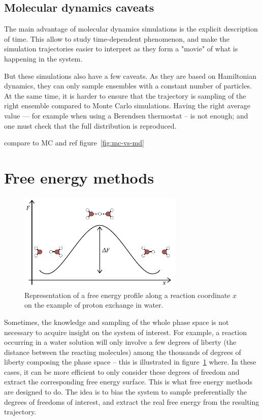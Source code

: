 \documentclass[thesis]{subfiles}
\begin{document}
\subsection{Molecular dynamics caveats}

The main advantage of molecular dynamics simulations is the explicit description
of time. This allow to study time-dependent phenomenon, and make the simulation
trajectories easier to interpret as they form a "movie" of what is happening in
the system.

But these simulations also have a few caveats. As they are based on Hamiltonian
dynamics, they can only sample ensembles with a constant number of particles.
At the same time, it is harder to ensure that the trajectory is sampling of the
right ensemble compared to Monte Carlo simulations. Having the right average
value --- for example when using a Berendsen thermostat -- is not enough; and
one must check that the full distribution is reproduced.

\TODO compare to MC and ref figure~\ref{fig:mc-vs-md}

\newpage
\section{Free energy methods}

\begin{figure}[ht]
    \centering
    \includegraphics[width=0.7\textwidth]{figures/images/free-energy-profile}
    \caption{Representation of a free energy profile along a reaction
    coordinate $x$ on the example of proton exchange in water.}
    \label{fig:free-energy-profile}
\end{figure}

Sometimes, the knowledge and sampling of the whole phase space is not necessary
to acquire insight on the system of interest. For example, a reaction occurring
in a water solution will only involve a few degrees of liberty (the distance
between the reacting molecules) among the thousands of degrees of liberty
composing the phase space -- this is illustrated in
figure~\ref{fig:free-energy-profile} where. In these cases, it can be more
efficient to only consider these degrees of freedom and extract the
corresponding free energy surface. This is what free energy methods are designed
to do. The idea is to bias the system to sample preferentially the degrees of
freedoms of interest, and extract the real free energy from the resulting
trajectory.
\end{document}
